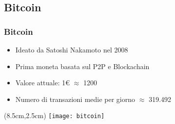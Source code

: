 \subsection{Bitcoin}
\begin{frame}
 \frametitle{Bitcoin}

 \begin{itemize}
  \item<1-> Ideato da Satoshi Nakamoto nel 2008
  \item<2-> Prima moneta basata sul P2P e Blockachain%
  \item<3-> Valore attuale: 1\euro{} $ \approx $  1200\bitcoin{}
  \item<4-> Numero di transazioni medie per giorno $ \approx $ 319.492
 \end{itemize}



 \begin{textblock*}{5cm}(8.5cm,2.5cm)
  \texttt{[image: bitcoin]}
 \end{textblock*}

\end{frame}
